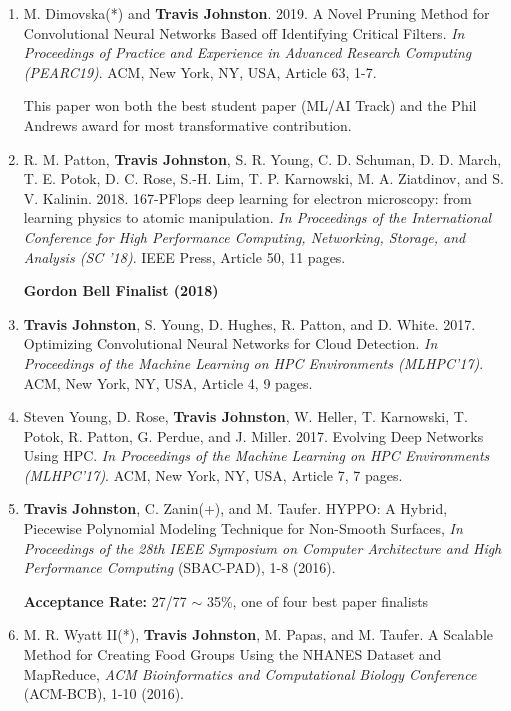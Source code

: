 \documentclass{article}
\begin{document}
\begin{enumerate}[1.]
        \item M. Dimovska(*) and \textbf{Travis Johnston}. 2019.
        A Novel Pruning Method for Convolutional Neural Networks Based off Identifying
        Critical Filters.
        \textit{In Proceedings of Practice and Experience in Advanced Research Computing (PEARC19)}.
        ACM, New York, NY, USA, Article 63, 1-7.

        This paper won both the best student paper (ML/AI Track) and the Phil Andrews award for most transformative contribution.


        \item R. M. Patton, \textbf{Travis Johnston}, S. R. Young, C. D. Schuman, D. D. March,
        T. E. Potok, D. C. Rose, S.-H. Lim, T. P. Karnowski, M. A. Ziatdinov, and 
        S. V. Kalinin. 2018.
        167-PFlops deep learning for electron microscopy: 
        from learning physics to atomic manipulation. 
        \textit{In Proceedings of the International Conference for High Performance Computing,
        Networking, Storage, and Analysis (SC '18)}. IEEE Press, Article 50, 11 pages.

        \textbf{Gordon Bell Finalist (2018)}

		\item \textbf{Travis Johnston}, S. Young, D. Hughes, R. Patton, and D. White. 2017.
		Optimizing Convolutional Neural Networks for Cloud Detection.  
        \textit{In Proceedings of the Machine Learning on HPC Environments (MLHPC'17)}. ACM, New York, NY, USA, Article 4, 9 pages.

        \item Steven Young, D. Rose, \textbf{Travis Johnston}, W. Heller, T. Karnowski, T. Potok, R. Patton, G. Perdue, and J. Miller. 2017.
        Evolving Deep Networks Using HPC.
        \textit{In Proceedings of the Machine Learning on HPC Environments (MLHPC'17)}. ACM, New York, NY, USA, Article 7, 7 pages.

	
		\item \textbf{Travis Johnston}, C. Zanin(+), and M. Taufer.  HYPPO: A Hybrid, Piecewise Polynomial Modeling Technique for Non-Smooth Surfaces,
		\textit{In Proceedings of the 28th IEEE Symposium on Computer Architecture and High Performance Computing} (SBAC-PAD), 1-8 (2016).
		
		\textbf{Acceptance Rate: } 27/77 $\sim$ 35\%, one of four best paper finalists

		
		\item M. R. Wyatt II(*), \textbf{Travis Johnston}, M. Papas, and M. Taufer. A Scalable Method for Creating Food Groups Using the NHANES Dataset and MapReduce,
		\textit{ACM Bioinformatics and Computational Biology Conference} (ACM-BCB), 1-10 (2016).


\end{enumerate}
\end{document}
